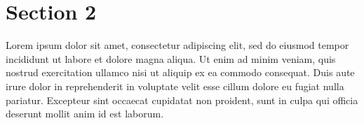 \clearpage


\section{Section 2}
Lorem ipsum dolor sit amet, consectetur adipiscing elit,
sed do eiusmod tempor incididunt ut labore et dolore magna aliqua.
Ut enim ad minim veniam,
quis nostrud exercitation ullamco  nisi ut aliquip ex ea commodo consequat.
Duis aute irure dolor in reprehenderit in voluptate velit esse cillum dolore eu fugiat nulla pariatur.
Excepteur sint occaecat cupidatat non proident,
sunt in culpa qui officia deserunt mollit anim id est laborum\cites{PaperSample1,PaperSample2,PaperSample3}.

